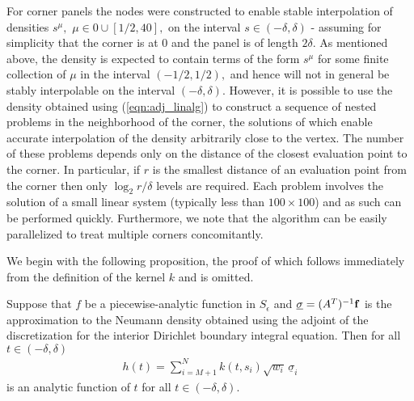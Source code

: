 For corner panels the nodes were constructed to enable stable interpolation of densities $s^\mu,$ $\mu \in 0 \cup [1/2,40],$ on the interval $s \in (-\delta,\delta)$ - assuming for simplicity that the corner is at $0$ and the panel is of length $2 \delta.$ As mentioned above, the density is expected to contain terms of the form $s^\mu$ for some finite collection of $\mu$ in the interval $(-1/2,1/2),$ and hence will not in general be stably interpolable on the interval $(-\delta,\delta).$ However, it is possible to use the density obtained using (\ref{eqn:adj_linalg}) to construct a sequence of nested problems in the neighborhood of the corner, the solutions of which enable accurate interpolation of the density arbitrarily close to the vertex. The number of these problems depends only on the distance of the closest evaluation point to the corner. In particular, if $r$ is the smallest distance of an evaluation point from the corner then only $\log_2 r/\delta$ levels are required. Each problem involves the solution of a small linear system (typically less than $100 \times 100$) and as such can be performed quickly. Furthermore, we note that the algorithm can be easily parallelized to treat multiple corners concomitantly.

We begin with the following proposition, the proof of which follows immediately from the definition of the kernel $k$ and is omitted.
\begin{proposition}
Suppose that $f$ be a piecewise-analytic function in $S_\epsilon$ and  $\underline{\sigma} = (A^T)^{-1} {\bf f}$ is the approximation to the Neumann density obtained using the adjoint of the discretization for the interior Dirichlet boundary integral equation. Then for all $t \in (-\delta,\delta)$
\begin{align}
h(t) = \sum_{i=M+1}^N k(t,s_i) \sqrt{w_i} \,\underline{\sigma}_i
\end{align}
is an analytic function of $t$ for all $t \in (-\delta,\delta).$
\end{proposition}

